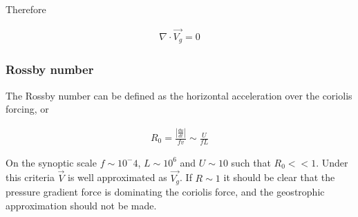 \documentclass[a4paper,12pt]{article}
\begin{document}
Therefore

\begin{align}
\boxed{\nabla \cdot \vec{V_g} = 0}
\end{align}


\subsubsection*{Rossby number}

The Rossby number can be defined as the horizontal acceleration over the coriolis forcing, or

\begin{align}
\boxed{R_0 = \frac{|\frac{du}{dt}|}{fv} \sim \frac{U}{fL}}
\end{align}

On the synoptic scale $f \sim 10^-4$, $L \sim 10^6$ and $U \sim 10$ such that $R_0 << 1$. Under this criteria $\vec{V}$ is well approximated as $\vec{V_g}$. If $R \sim 1$ it should be clear that the pressure gradient force is dominating the coriolis force, and the geostrophic approximation should not be made.
\end{document}
